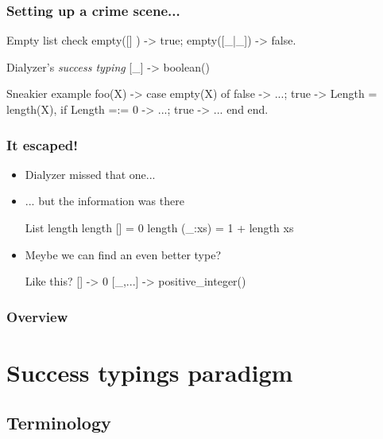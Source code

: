 \documentclass{beamer}
\newcommand{\st}{\emph{success typing}}
\begin{document}
\begin{frame}[fragile]
  \frametitle{Setting up a crime scene...}
\begin{code}{Empty list check}
empty([]   ) -> true;
empty([_|_]) -> false.
\end{code}
\pause
\begin{code}{Dialyzer's \st}
[_] -> boolean()
\end{code}
\pause
\begin{code}{Sneakier example}
foo(X) -> case empty(X) of
            false -> ...;
            true  -> Length = length(X),
                     if Length =:= 0 -> ...;
                        true         -> ...
                     end
          end.
\end{code}
\end{frame}

\begin{frame}[fragile]
  \frametitle{It escaped!}
  \begin{itemize}
    \item Dialyzer missed that one... \pause
    \item ... but the information was there
\begin{code}{List length}
length     [] = 0
length (_:xs) = 1 + length xs
\end{code} \pause
    \item Meybe we can find an even better type? \pause
\begin{code}{Like this?}
[]      -> 0
[_,...] -> positive_integer()
\end{code}
  \end{itemize}
\end{frame}

\begin{frame}
  \frametitle{Overview}
  \tableofcontents[hidesubsections]
\end{frame}

\section{Success typings paradigm}

\subsection{Terminology}
\end{document}
